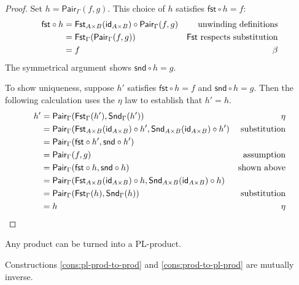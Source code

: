 \begin{proof}
  Set \(h = \mathsf{Pair}_\Gamma(f,g)\). This choice of \(h\) satisfies \(\mathsf{fst}\circ h = f\):
  \begin{align*}
    \mathsf{fst} \circ h
    &= \mathsf{Fst}_{A\times B}(\mathsf{id}_{A\times B}) \circ \mathsf{Pair}_{\Gamma}(f,g) & \text{unwinding definitions} \\
    &= \mathsf{Fst}_{\Gamma}(\mathsf{Pair}_{\Gamma}(f,g)) & \text{\(\mathsf{Fst}\) respects substitution} \\
    &= f & \text{\(\beta\)}
  \end{align*}
  The symmetrical argument shows \(\mathsf{snd} \circ h = g\).

  To show uniqueness, suppose \(h'\) satisfies \(\mathsf{fst} \circ h = f\) and \(\mathsf{snd} \circ h = g\).
  Then the following calculation uses the \(\eta\) law to establish that \(h' = h\).
  \begin{align*}
    h' &= \mathsf{Pair}_\Gamma(\mathsf{Fst}_\Gamma(h'),\mathsf{Snd}_\Gamma(h')) & \text{\(\eta\)} \\
     &= \mathsf{Pair}_\Gamma(\mathsf{Fst}_{A\times B}(\mathsf{id}_{A\times B})\circ h',\mathsf{Snd}_{A\times B}(\mathsf{id}_{A\times B})\circ h') & \text{substitution} \\
     &= \mathsf{Pair}_\Gamma(\mathsf{fst}\circ h',\mathsf{snd}\circ h') & \\
     &= \mathsf{Pair}_\Gamma(f,g) & \text{assumption} \\
     &= \mathsf{Pair}_\Gamma(\mathsf{fst}\circ h,\mathsf{snd} \circ h) & \text{shown above} \\
     &= \mathsf{Pair}_\Gamma(\mathsf{Fst}_{A\times B}(\mathsf{id}_{A\times B})\circ h,\mathsf{Snd}_{A\times B}(\mathsf{id}_{A\times B}) \circ h) & \\
     &= \mathsf{Pair}_\Gamma(\mathsf{Fst}_\Gamma(h),\mathsf{Snd}_\Gamma(h)) & \text{substitution} \\
     &= h & \text{\(\eta\)}
  \end{align*}

\end{proof}

\begin{construction} \label{cons:prod-to-pl-prod}
  Any product can be turned into a PL-product.
\end{construction}

\begin{proposition}
 Constructions
 \ref{cons:pl-prod-to-prod}
 and
 \ref{cons:prod-to-pl-prod}
 are mutually inverse.
\end{proposition}


